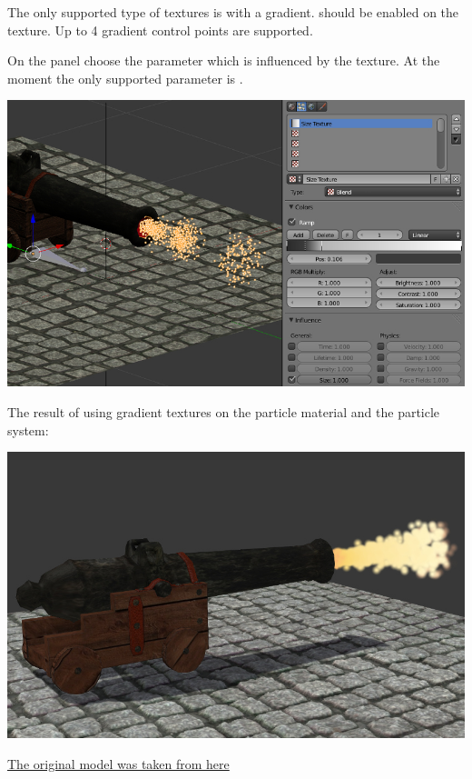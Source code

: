 \documentclass[a4paper,12pt,oneside]{sphinxmanual}
\begin{document}
The only supported type of textures is  with a  gradient.  should be enabled on the texture. Up to 4 gradient control points are supported.

On the  panel choose the parameter which is influenced by the texture. At the moment the only supported parameter is .

{\hfill\includegraphics[width=1.000\linewidth]{particles_settings_ramp_size.jpg}\hfill}

\begin{DUlineblock}{0em}
\item[] 
\end{DUlineblock}

The result of using gradient textures on the particle material and the particle system:

{\hfill\includegraphics[width=1.000\linewidth]{particles_gun.jpg}\hfill}

\href{http://www.blendswap.com/blends/view/13977}{The original model was taken from here}
\label{particles_instancing:particles-instancing}
\end{document}
